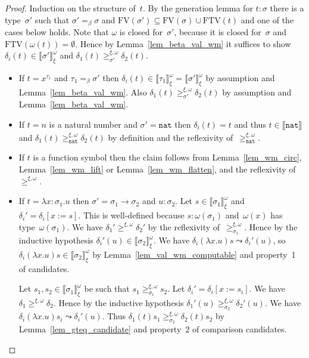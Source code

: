 \documentclass[runningheads,a4paper]{llncs}
\newcommand{\arrtype}{\rightarrow}
\newcommand{\abs}[2]{\lambda #1.#2}
\newcommand{\subst}[2]{#1:=#2}
\newcommand{\FTV}{\mathrm{FTV}}
\newcommand{\FV}{\mathrm{FV}}
\newcommand{\nat}{\mathtt{nat}}
\newcommand{\val}[3]{\ensuremath{\llbracket#1\rrbracket_{#2}^{#3}}}
\newcommand{\gteq}[3]{\ensuremath{\ge_{#1}^{#2,#3}}}
\begin{document}
\begin{proof}
  Induction on the structure of~$t$. By the generation lemma for $t :
  \sigma$ there is a type~$\sigma'$ such that $\sigma' =_\beta \sigma$
  and $\FV(\sigma') \subseteq \FV(\sigma) \cup \FTV(t)$ and one of the
  cases below holds. Note that $\omega$ is closed for~$\sigma'$,
  because it is closed for~$\sigma$ and $\FTV(\omega(t)) =
  \emptyset$. Hence by Lemma~\ref{lem_beta_val_wm} it suffices to show
  $\delta_i(t) \in \val{\sigma'}{\xi}{\omega}$ and $\delta_1(t)
  \gteq{\sigma'}{\xi}{\omega} \delta_2(t)$.
  \begin{itemize}
  \item If $t = x^{\tau_1}$ and $\tau_1 =_\beta \sigma'$ then
    $\delta_i(t) \in \val{\tau_1}{\xi}{\omega} =
    \val{\sigma'}{\xi}{\omega}$ by assumption and
    Lemma~\ref{lem_beta_val_wm}. Also $\delta_1(t)
    \gteq{\sigma'}{\xi}{\omega} \delta_2(t)$ by assumption and
    Lemma~\ref{lem_beta_val_wm}.
  \item If $t = n$ is a natural number and $\sigma' = \nat$ then
    $\delta_i(t) = t$ and thus $t \in \val{\nat}{}{}$ and $\delta_1(t)
    \gteq{\nat}{\xi}{\omega} \delta_2(t)$ by definition and the
    reflexivity of~$\gteq{\nat}{\xi}{\omega}$.
  \item If $t$ is a function symbol then the claim follows from
    Lemma~\ref{lem_wm_circ}, Lemma~\ref{lem_wm_lift} or
    Lemma~\ref{lem_wm_flatten}, and the reflexivity
    of~$\gteq{}{\xi}{\omega}$.
  \item If $t = \abs{x:\sigma_1}{u}$ then $\sigma' =
    \sigma_1\arrtype\sigma_2$ and $u : \sigma_2$. Let $s \in
    \val{\sigma_1}{\xi}{\omega}$ and
    $\delta_i'=\delta_i[\subst{x}{s}]$. This is well-defined because
    $s : \omega(\sigma_1)$ and~$\omega(x)$ has
    type~$\omega(\sigma_1)$. We have $\delta_1' \gteq{}{\xi}{\omega}
    \delta_2'$ by the reflexivity
    of~$\gteq{\sigma_1}{\xi}{\omega}$. Hence by the inductive
    hypothesis $\delta_i'(u) \in \val{\sigma_2}{\xi}{\omega}$. We have
    $\delta_i(\abs{x}{u}) s \leadsto \delta_i'(u)$, so
    $\delta_i(\abs{x}{u}) s \in \val{\sigma_2}{\xi}{\omega}$ by
    Lemma~\ref{lem_val_wm_computable} and property~1 of candidates.

    Let $s_1,s_2 \in \val{\sigma_1}{\xi}{\omega}$ be such that $s_1
    \gteq{\sigma_1}{\xi}{\omega} s_2$. Let
    $\delta_i'=\delta_i[\subst{x}{s_i}]$. We have $\delta_1
    \gteq{}{\xi}{\omega} \delta_2$. Hence by the inductive hypothesis
    $\delta_1'(u)\gteq{\sigma_2}{\xi}{\omega}\delta_2'(u)$. We have
    $\delta_i(\abs{x}{u}) s_i \leadsto \delta_i'(u)$. Thus
    $\delta_1(t) s_1 \gteq{\sigma_2}{\xi}{\omega} \delta_2(t) s_2$ by
    Lemma~\ref{lem_gteq_candidate} and property~2 of comparison
    candidates.


\end{itemize}
\end{proof}
\end{document}
